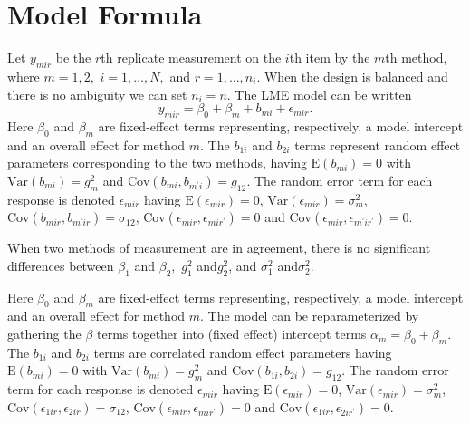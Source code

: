 \documentclass[12pt, a4paper]{report}
\theoremstyle{plain}
\theoremstyle{definition}
\theoremstyle{remark}
\begin{document}

\newpage
\section{Model Formula}
Let $y_{mir} $ be the $r$th replicate measurement on the $i$th item by the $m$th method, where $m=1,2,$ $i=1,\ldots,N,$ and $r = 1,\ldots,n_i.$ When the design is balanced and there is no ambiguity we can set $n_i=n.$ The LME model can be written
	\begin{equation}
	y_{mir} = \beta_{0} + \beta_{m} + b_{mi} + \epsilon_{mir}.
	\end{equation}
Here $\beta_0$ and $\beta_m$ are fixed-effect terms representing, respectively, a model intercept and an overall effect for method $m.$ The $b_{1i}$ and $b_{2i}$ terms represent random effect parameters corresponding to the two methods, having $\mathrm{E}(b_{mi})=0$ with $\mathrm{Var}(b_{mi})=g^2_m$ and $\mathrm{Cov}(b_{mi}, b_{m^\prime i})=g_{12}.$ The random error term for each response is denoted $\epsilon_{mir}$ having $\mathrm{E}(\epsilon_{mir})=0$, $\mathrm{Var}(\epsilon_{mir})=\sigma^2_m$, $\mathrm{Cov}(b_{mir}, b_{m^\prime ir})=\sigma_{12}$, $\mathrm{Cov}(\epsilon_{mir}, \epsilon_{mir^\prime})= 0$ and $\mathrm{Cov}(\epsilon_{mir}, \epsilon_{m^\prime ir^\prime})= 0.$
\bigskip

When two methods of measurement are in agreement, there is no significant differences between $\beta_1$ and $\beta_2,$ $g^2_1 $ and$ g^2_2$, and $\sigma^2_1 $ and$ \sigma^2_2$.
	
	Here $\beta_0$ and $\beta_m$ are fixed-effect terms representing, respectively, a model intercept and an overall effect for method $m.$ The model can be reparameterized by gathering the $\beta$ terms together into (fixed effect) intercept terms $\alpha_m=\beta_0+\beta_m.$ The $b_{1i}$ and $b_{2i}$ terms are correlated random effect parameters having $\mathrm{E}(b_{mi})=0$ with $\mathrm{Var}(b_{mi})=g^2_m$ and $\mathrm{Cov}(b_{1i}, b_{2 i})=g_{12}.$ The random error term for each response is denoted $\epsilon_{mir}$ having $\mathrm{E}(\epsilon_{mir})=0$, $\mathrm{Var}(\epsilon_{mir})=\sigma^2_m$, $\mathrm{Cov}(\epsilon_{1ir}, \epsilon_{2 ir})=\sigma_{12}$, $\mathrm{Cov}(\epsilon_{mir}, \epsilon_{mir^\prime})= 0$ and $\mathrm{Cov}(\epsilon_{1ir}, \epsilon_{2 ir^\prime})= 0.$ 
	
\end{document}
